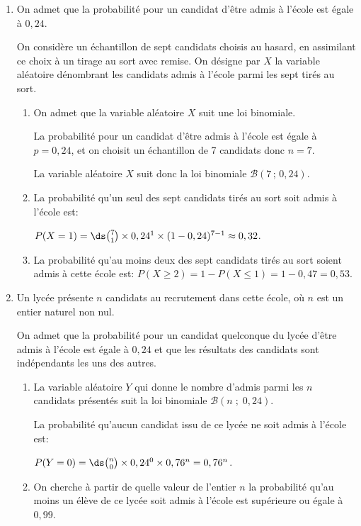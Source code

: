 \begin{enumerate}
\item On admet que la probabilité pour un candidat d'être admis à l'école est égale à $0,24$.

On considère un échantillon de sept candidats choisis au hasard, en assimilant ce choix à un tirage au sort avec remise. On désigne par $X$ la variable aléatoire dénombrant les candidats admis à l'école parmi les sept tirés au sort.
	\begin{enumerate}
		\item On admet que la variable aléatoire $X$ suit une loi binomiale. 
		
La probabilité pour un candidat d'être admis à l'école est égale à $p=0,24$, et on choisit un échantillon de 7 candidats donc $n=7$.

La variable aléatoire $X$ suit donc la loi binomiale $\mathcal{B}\left (7\,;\,0,24\right )$.
		
		\item La probabilité qu'un seul des sept candidats tirés au sort soit admis à l'école est:
		
$P(X=1)= \ds\binom{7}{1}\times 0,24^1 \times (1-0,24)^{7-1} \approx 0,32$.		
		
		\item La probabilité qu'au moins deux des sept candidats tirés au sort soient admis à cette école est: $P(X\geqslant 2) = 1-P(X\leqslant 1) = 1-0,47=0,53$.		
		
	\end{enumerate}
	
\item  Un lycée présente $n$ candidats au recrutement dans cette école, où $n$ est un entier naturel non nul.

On admet que la probabilité pour un candidat quelconque du lycée d'être admis à l'école est égale à $0,24$ et que les résultats des candidats sont indépendants les uns des autres.

	\begin{enumerate}
		\item La variable aléatoire $Y$ qui donne le nombre d'admis parmi les $n$ candidats présentés suit la loi binomiale $\mathcal{B}\left (n\;;\;0,24\right )$.
		
		 La probabilité qu'aucun candidat issu de ce lycée ne soit admis à l'école est:
		
$P(Y=0) = \ds\binom{n}{0}\times 0,24^0 \times 0,76^n=0,76^n$.		
		
		\item On cherche à partir de quelle valeur de l'entier $n$ la probabilité qu'au moins un élève de ce lycée soit admis à l'école est supérieure ou égale à $0,99$.
		

\end{enumerate}
\end{enumerate}
